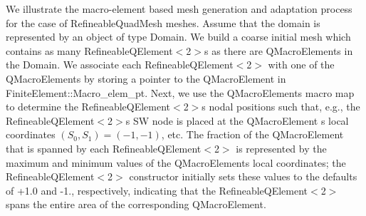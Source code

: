 We illustrate the macro-\/element based mesh generation and adaptation process for the case of {\ttfamily Refineable\+Quad\+Mesh} meshes. Assume that the domain is represented by an object of type {\ttfamily Domain}. We build a coarse initial mesh which contains as many {\ttfamily Refineable\+Q\+Element$<$2$>$s} as there are {\ttfamily Q\+Macro\+Elements} in the {\ttfamily Domain}. We associate each {\ttfamily Refineable\+Q\+Element$<$2$>$} with one of the {\ttfamily Q\+Macro\+Elements} by storing a pointer to the {\ttfamily Q\+Macro\+Element} in {\ttfamily Finite\+Element\+::\+Macro\+\_\+elem\+\_\+pt}. Next, we use the {\ttfamily Q\+Macro\+Elements\textquotesingle{}} macro map to determine the {\ttfamily Refineable\+Q\+Element$<$2$>$\textquotesingle{}s} nodal positions such that, e.\+g., the {\ttfamily Refineable\+Q\+Element$<$2$>$\textquotesingle{}s} SW node is placed at the {\ttfamily Q\+Macro\+Element} \textquotesingle{}s local coordinates $(S_0,S_1)=(-1,-1)$, etc. The fraction of the {\ttfamily Q\+Macro\+Element} that is spanned by each {\ttfamily Refineable\+Q\+Element$<$2$>$} is represented by the maximum and minimum values of the {\ttfamily Q\+Macro\+Element\textquotesingle{}s} local coordinates; the {\ttfamily Refineable\+Q\+Element$<$2$>$} constructor initially sets these values to the defaults of +1.0 and -\/1., respectively, indicating that the {\ttfamily Refineable\+Q\+Element$<$2$>$} spans the entire area of the corresponding {\ttfamily Q\+Macro\+Element}.


